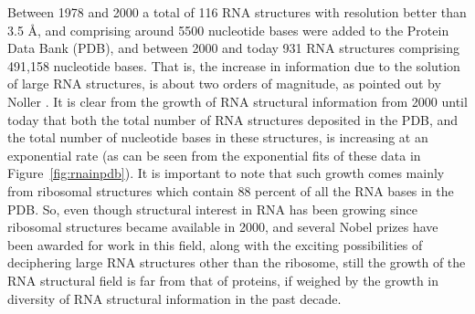 \noindent Between  1978 and  2000 a total  of 116 RNA  structures with
resolution better than 3.5  \AA, and comprising around 5500 nucleotide
bases were added to the Protein  Data Bank (PDB), and between 2000 and
today  931  RNA  structures comprising  491,158  nucleotide
bases.  That  is, the increase in  information due to  the solution of
large RNA structures, is about two orders of magnitude, as pointed out
by  Noller \cite{noller2005}.   It is  clear  from the  growth of  RNA
structural  information from  2000  until today  that  both the  total
number of RNA structures deposited in the PDB, and the total number of
nucleotide bases in these  structures, is increasing at an exponential
rate  (as can  be seen  from  the exponential  fits of  these data  in
Figure~\ref{fig:rnainpdb}).  It is important  to note that such growth
comes mainly from ribosomal structures which contain 88 percent of all
the RNA bases in the PDB.   So, even though structural interest in RNA
has been growing since  ribosomal structures became available in 2000,
and several  Nobel prizes  have been awarded  for work in  this field,
along  with  the  exciting  possibilities  of  deciphering  large  RNA
\cite{weinberg2009}  structures  other than  the  ribosome, still  the
growth of  the RNA structural field  is far from that  of proteins, if
weighed by  the growth in  diversity of RNA structural  information in
the past decade.

